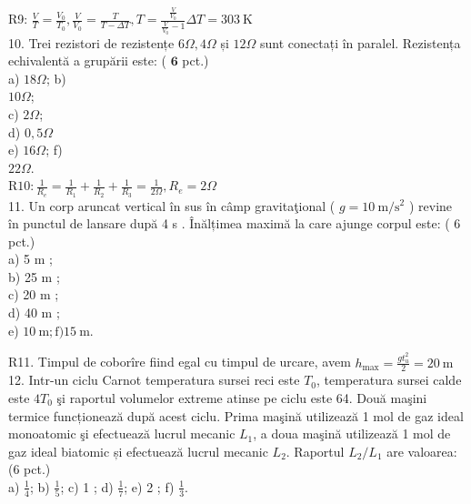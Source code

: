 R9: $\frac{V}{T}=\frac{V_{0}}{T_{0}}, \frac{V}{V_{0}}=\frac{T}{T-\Delta T}, T=\frac{\frac{V}{V_{0}}}{\frac{V}{V_{0}}-1} \Delta T=303 \mathrm{~K}$\\
10. Trei rezistori de rezistențe $6 \Omega, 4 \Omega$ și $12 \Omega$ sunt conectați în paralel. Rezistența echivalentă a grupării este: ( $\mathbf{6}$ pct.)\\
a) $18 \Omega$; b)\\
$10 \Omega$;\\
c) $2 \Omega$;\\
d) $0,5 \Omega$\\
e) $16 \Omega$; f)\\
$22 \Omega$.\\
$\mathrm{R} 10: \frac{1}{R_{e}}=\frac{1}{R_{1}}+\frac{1}{R_{2}}+\frac{1}{R_{3}}=\frac{1}{2 \Omega}, R_{e}=2 \Omega$\\
11. Un corp aruncat vertical în sus în câmp gravitaţional ( $g=10 \mathrm{~m} / \mathrm{s}^{2}$ ) revine în punctul de lansare după 4 s . Înălțimea maximă la care ajunge corpul este: ( 6 pct.)\\
a) 5 m ;\\
b) 25 m ;\\
c) 20 m ;\\
d) 40 m ;\\
e) $10 \mathrm{~m} ; \mathrm{f}) 15 \mathrm{~m}$.

R11. Timpul de coborîre fiind egal cu timpul de urcare, avem $h_{\max }=\frac{g t_{u}^{2}}{2}=20 \mathrm{~m}$\\
12. Intr-un ciclu Carnot temperatura sursei reci este $T_{0}$, temperatura sursei calde este $4 T_{0}$ şi raportul volumelor extreme atinse pe ciclu este 64. Două maşini termice funcționează după acest ciclu. Prima maşină utilizează 1 mol de gaz ideal monoatomic şi efectuează lucrul mecanic $L_{1}$, a doua maşină utilizează 1 mol de gaz ideal biatomic și efectuează lucrul mecanic $L_{2}$. Raportul $L_{2} / L_{1}$ are valoarea: (6 pct.)\\
a) $\frac{1}{4}$; b) $\frac{1}{5}$; c) 1 ; d) $\frac{1}{7}$; e) 2 ; f) $\frac{1}{3}$.

